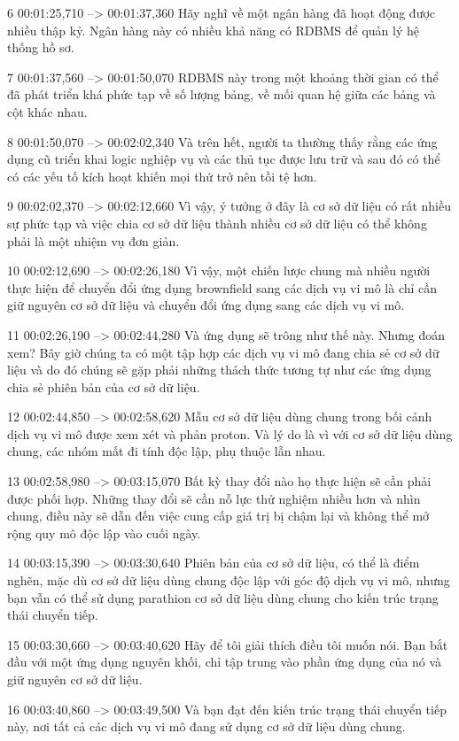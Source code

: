 6
00:01:25,710 --> 00:01:37,360
Hãy nghĩ về một ngân hàng đã hoạt động được nhiều thập kỷ.  Ngân hàng này có nhiều khả năng có RDBMS để quản lý hệ thống hồ sơ.

7
00:01:37,560 --> 00:01:50,070
RDBMS này trong một khoảng thời gian có thể đã phát triển khá phức tạp về số lượng bảng, về mối quan hệ giữa các bảng và cột khác nhau.

8
00:01:50,070 --> 00:02:02,340
Và trên hết, người ta thường thấy rằng các ứng dụng cũ triển khai logic nghiệp vụ và các thủ tục được lưu trữ và sau đó có thể có các yếu tố kích hoạt khiến mọi thứ trở nên tồi tệ hơn.

9
00:02:02,370 --> 00:02:12,660
Vì vậy, ý tưởng ở đây là cơ sở dữ liệu có rất nhiều sự phức tạp và việc chia cơ sở dữ liệu thành nhiều cơ sở dữ liệu có thể không phải là một nhiệm vụ đơn giản.

10
00:02:12,690 --> 00:02:26,180
Vì vậy, một chiến lược chung mà nhiều người thực hiện để chuyển đổi ứng dụng brownfield sang các dịch vụ vi mô là chỉ cần giữ nguyên cơ sở dữ liệu và chuyển đổi ứng dụng sang các dịch vụ vi mô.

11
00:02:26,190 --> 00:02:44,280
Và ứng dụng sẽ trông như thế này.  Nhưng đoán xem?  Bây giờ chúng ta có một tập hợp các dịch vụ vi mô đang chia sẻ cơ sở dữ liệu và do đó chúng sẽ gặp phải những thách thức tương tự như các ứng dụng chia sẻ phiên bản của cơ sở dữ liệu.

12
00:02:44,850 --> 00:02:58,620
Mẫu cơ sở dữ liệu dùng chung trong bối cảnh dịch vụ vi mô được xem xét và phản proton.  Và lý do là vì với cơ sở dữ liệu dùng chung, các nhóm mất đi tính độc lập, phụ thuộc lẫn nhau.

13
00:02:58,980 --> 00:03:15,070
Bất kỳ thay đổi nào họ thực hiện sẽ cần phải được phối hợp.  Những thay đổi sẽ cần nỗ lực thử nghiệm nhiều hơn và nhìn chung, điều này sẽ dẫn đến việc cung cấp giá trị bị chậm lại và không thể mở rộng quy mô độc lập vào cuối ngày.

14
00:03:15,390 --> 00:03:30,640
Phiên bản của cơ sở dữ liệu, có thể là điểm nghẽn, mặc dù cơ sở dữ liệu dùng chung độc lập với góc độ dịch vụ vi mô, nhưng bạn vẫn có thể sử dụng parathion cơ sở dữ liệu dùng chung cho kiến ​​trúc trạng thái chuyển tiếp.

15
00:03:30,660 --> 00:03:40,620
Hãy để tôi giải thích điều tôi muốn nói.  Bạn bắt đầu với một ứng dụng nguyên khối, chỉ tập trung vào phần ứng dụng của nó và giữ nguyên cơ sở dữ liệu.

16
00:03:40,860 --> 00:03:49,500
Và bạn đạt đến kiến ​​trúc trạng thái chuyển tiếp này, nơi tất cả các dịch vụ vi mô đang sử dụng cơ sở dữ liệu dùng chung.


